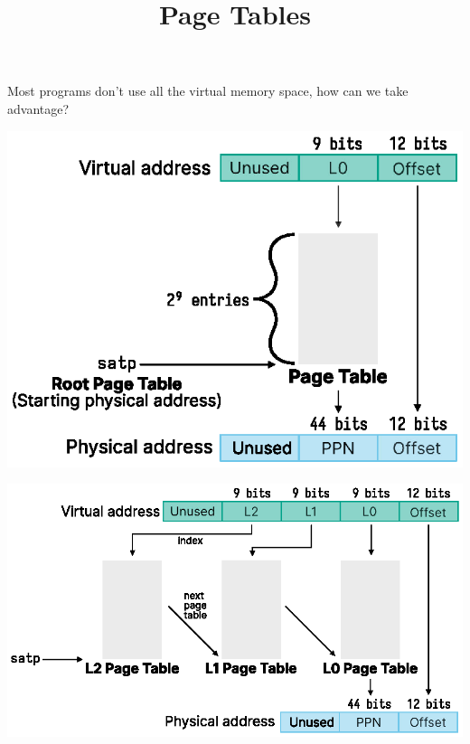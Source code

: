 

\title{Page Tables}



  \begin{frame}
    \titlepage
  \end{frame}

  \begin{slide}
    

    Most programs don't use all the virtual memory space, how can we take
    advantage?

  \end{slide}
  
  \begin{slide}
    

    \centering
    \includegraphics{single-level-page-table-small.eps}

  \end{slide}

  \begin{slide}


    \centering
    \includegraphics{multi-level-page-table.eps}

  \end{slide}

